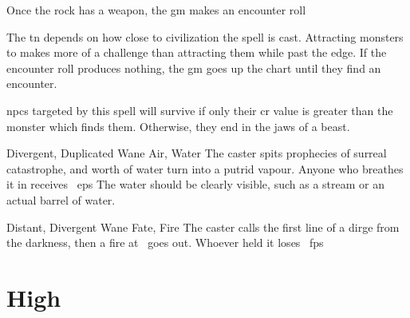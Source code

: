 \begin{multicols}{2}
{{    Once the rock has a weapon, the \gls{gm} makes an encounter roll}%
    {
      The \gls{tn} depends on how close to civilization the spell is cast.
      Attracting \glspl{monster} to  makes more of a challenge than attracting them while past the \gls{edge}.%
      If the encounter roll produces nothing, the \gls{gm} goes up the chart until they find an encounter.

      \Glspl{npc} targeted by this spell will survive if only their \gls{cr} value is greater than the \gls{monster} which finds them.
      Otherwise, they end in the jaws of a beast.
    }

}{}

  {Divergent, Duplicated}%
  {Wane}%
  {Air, Water}%
  {}%
  {The caster spits prophecies of surreal catastrophe, and  worth of water turn into a putrid vapour.
  Anyone who breathes it in receives ~\glspl{ep}}%
  {
    The water should be clearly visible, such as a stream or an actual barrel of water.}

  {Distant, Divergent}%
  {Wane}%
  {Fate, Fire}%
  {}%
  {The caster calls the first line of a dirge from the darkness, then a fire at \spellRange\ goes out.
  Whoever held it loses \showDam~\glspl{fp}}%
  {}




\end{multicols}

\section{High }


